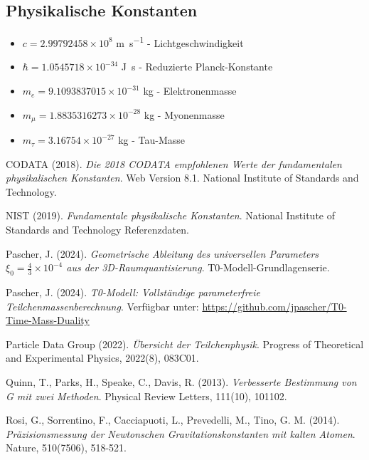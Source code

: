 \documentclass[12pt,a4paper]{article}
\theoremstyle{definition}
\begin{document}
	\subsection{Physikalische Konstanten}
	\begin{itemize}
		\item $c = 2.99792458 \times 10^8$ \si{\metre\per\second} - Lichtgeschwindigkeit
		\item $\hbar = 1.0545718 \times 10^{-34}$ \si{\joule\second} - Reduzierte Planck-Konstante
		\item $m_e = 9.1093837015 \times 10^{-31}$ \si{\kilogram} - Elektronenmasse
		\item $m_\mu = 1.8835316273 \times 10^{-28}$ \si{\kilogram} - Myonenmasse
		\item $m_\tau = 3.16754 \times 10^{-27}$ \si{\kilogram} - Tau-Masse
	\end{itemize}
	
	\newpage
	\begin{thebibliography}{99}
		
		CODATA (2018). \textit{Die 2018 CODATA empfohlenen Werte der fundamentalen physikalischen Konstanten}.
		Web Version 8.1. National Institute of Standards and Technology.
		
		NIST (2019). \textit{Fundamentale physikalische Konstanten}.
		National Institute of Standards and Technology Referenzdaten.
		
		Pascher, J. (2024). \textit{Geometrische Ableitung des universellen Parameters $\xi_0 = \frac{4}{3} \times 10^{-4}$ aus der 3D-Raumquantisierung}.
		T0-Modell-Grundlagenserie.
		
		Pascher, J. (2024). \textit{T0-Modell: Vollständige parameterfreie Teilchenmassenberechnung}.
		Verfügbar unter: \url{https://github.com/jpascher/T0-Time-Mass-Duality}
		
		Particle Data Group (2022). \textit{Übersicht der Teilchenphysik}.
		Progress of Theoretical and Experimental Physics, 2022(8), 083C01.
		
		Quinn, T., Parks, H., Speake, C., Davis, R. (2013). \textit{Verbesserte Bestimmung von G mit zwei Methoden}.
		Physical Review Letters, 111(10), 101102.
		
		Rosi, G., Sorrentino, F., Cacciapuoti, L., Prevedelli, M., Tino, G. M. (2014). \textit{Präzisionsmessung der Newtonschen Gravitationskonstanten mit kalten Atomen}.
		Nature, 510(7506), 518-521.
		
	\end{thebibliography}
	
\end{document}
